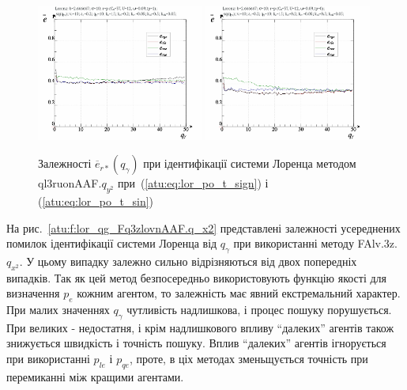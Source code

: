 \begin{figure}[ht!]
  \centerline{
    \includegraphics[width=0.49\textwidth]{p/cha/lor/ql3ruonAAF/lor_ql3ruonAAF_qy2-p_qgamma_e_sign.png}
    \hfill
    \includegraphics[width=0.49\textwidth]{p/cha/lor/ql3ruonAAF/lor_ql3ruonAAF_qy2-p_qgamma_e_sin.png}
  }
\caption{Залежності $ \overline{e}_{r *} (q_\gamma) $ при ідентифікації системи Лоренца методом ql3ruonAAF.$q_{y^2} $ при~(\ref{atu:eq:lor_po_t_sign}) і (\ref{atu:eq:lor_po_t_sin})}
  \label{atu:f:lor_qg_ql3ruonAAF.q_y2}
\end{figure}


На рис.~\ref{atu:f:lor_qg_Fq3zlovnAAF.q_x2} представлені залежності усереднених
помилок ідентифікації системи Лоренца від
$ q_\gamma $ при використанні методу
FAlv.3z.$q_{x^2}$.
У цьому випадку залежно сильно відрізняються від двох
попередніх випадків. Так як цей метод безпосередньо
використовують функцію якості для визначення
$ p_e $ кожним агентом, то залежність має явний екстремальний
характер. При малих значеннях
$ q_\gamma $ чутливість надлишкова, і процес пошуку порушується. При
великих - недостатня, і крім надлишкового впливу ``далеких''
агентів також знижується швидкість і точність пошуку. Вплив
``далеких'' агентів ігнорується при використанні
$ p_{le} $ і
$ p_{qe} $, проте, в ціх методах зменьщується точність при перемиканні
між кращими агентами.


